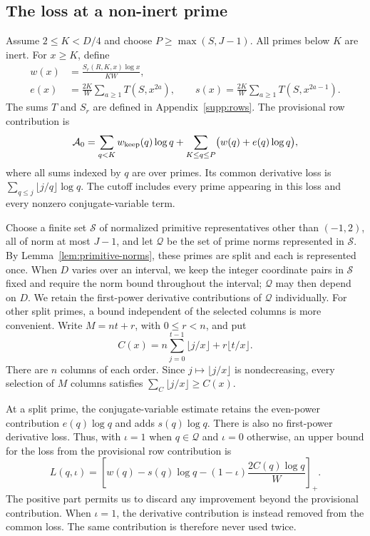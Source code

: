 \subsection{The loss at a non-inert prime}
Assume $2\leq K<D/4$ and choose $P\geq\max(S,J-1)$.
All primes below $K$ are inert. For $x\geq K$, define
\begin{equation}\label{eq:prime-loss-weights}
 \begin{split}
 w(x)&=\frac{S_r(R,K,x)\log x}{KW},\\
 e(x)&=\frac{2K}{W}\sum_{a\geq1}T(S,x^{2a}),\qquad
 s(x)=\frac{2K}{W}\sum_{a\geq1}T(S,x^{2a-1}).
 \end{split}
\end{equation}
The sums $T$ and $S_r$ are defined in Appendix~\ref{supp:rows}.
The provisional row contribution is
\begin{equation}\label{eq:all-prime-contribution}
 \mathcal A_0=\sum_{q<K}w_{\rm keep}(q)\log q
       +\sum_{K\leq q\leq P}\bigl(w(q)+e(q)\log q\bigr),
\end{equation}
where all sums indexed by $q$ are over primes. Its common derivative
loss is $\sum_{q\leq j}\lfloor j/q\rfloor\log q$.
The cutoff includes every prime appearing in this loss and every
nonzero conjugate-variable term.

Choose a finite set $\mathcal S$ of normalized primitive representatives
other than $(-1,2)$, all of norm at most $J-1$, and let $\mathcal Q$ be
the set of prime norms represented in $\mathcal S$.
By Lemma~\ref{lem:primitive-norms}, these primes are split and each is
represented once. When $D$ varies over an interval, we keep the integer
coordinate pairs in $\mathcal S$ fixed and require the norm bound
throughout the interval; $\mathcal Q$ may then depend on $D$.
We retain the first-power derivative contributions of $\mathcal Q$
individually.
For other split primes, a bound independent of the selected columns is
more convenient. Write $M=nt+r$, with $0\leq r<n$, and put
\begin{equation}\label{eq:minimum-column-sum}
 C(x)=n\sum_{j=0}^{t-1}\lfloor j/x\rfloor+r\lfloor t/x\rfloor.
\end{equation}
There are $n$ columns of each order. Since $j\mapsto\lfloor j/x\rfloor$
is nondecreasing, every selection of $M$ columns satisfies
$\sum_C\lfloor j/x\rfloor\geq C(x)$.

At a split prime, the conjugate-variable estimate retains the even-power
contribution $e(q)\log q$ and adds $s(q)\log q$. There is also no
first-power derivative loss. Thus, with $\iota=1$ when $q\in\mathcal Q$
and $\iota=0$ otherwise, an upper bound for the loss from the provisional
row contribution is
\begin{equation}\label{eq:split-loss}
 L(q,\iota)=
 \left[w(q)-s(q)\log q-(1-\iota)\frac{2C(q)\log q}{W}\right]_+.
\end{equation}
The positive part permits us to discard any improvement beyond the
provisional contribution. When $\iota=1$, the derivative contribution
is instead removed from the common loss. The same contribution is
therefore never used twice.

